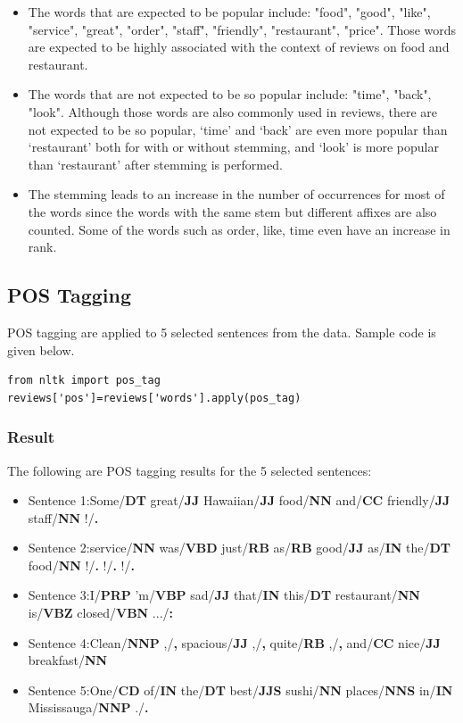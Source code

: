 \documentclass[sigconf]{acmart}
\begin{document}
\begin{itemize}
\item The words that are expected to be popular include: "food", "good", "like", "service", "great", "order", "staff", "friendly", "restaurant", "price". Those words are expected to be highly associated with the context of reviews on food and restaurant.
\item The words that are not expected to be so popular include: "time", "back", "look". Although those words are also commonly used in reviews, there are not expected to be so popular, ‘time’ and ‘back’ are even more popular than ‘restaurant’ both for with or without stemming, and ‘look’ is more popular than ‘restaurant’ after stemming is performed.
\item The stemming leads to an increase in the number of occurrences for most of the words since the words with the same stem but different affixes are also counted. Some of the words such as order, like, time even have an increase in rank.
\end{itemize}

\subsection{POS Tagging}
POS tagging are applied to 5 selected sentences from the data. Sample code is given below.
\begin{verbatim}
from nltk import pos_tag
reviews['pos']=reviews['words'].apply(pos_tag)
\end{verbatim}

\subsubsection{Result} The following are POS tagging results for the 5 selected sentences:
\begin{itemize}
\item{Sentence 1}:Some/\textbf{DT} great/\textbf{JJ} Hawaiian/\textbf{JJ} food/\textbf{NN} and/\textbf{CC} friendly/\textbf{JJ} staff/\textbf{NN} !/\textbf{.}
\item{Sentence 2}:service/\textbf{NN} was/\textbf{VBD} just/\textbf{RB}  as/\textbf{RB} good/\textbf{JJ} as/\textbf{IN} the/\textbf{DT} food/\textbf{NN} !/\textbf{.} !/\textbf{.} !/\textbf{.}
\item{Sentence 3}:I/\textbf{PRP} 'm/\textbf{VBP} sad/\textbf{JJ}  that/\textbf{IN} this/\textbf{DT} restaurant/\textbf{NN} is/\textbf{VBZ} closed/\textbf{VBN} .../\textbf{:}
\item{Sentence 4}:Clean/\textbf{NNP} ,/\textbf{,} spacious/\textbf{JJ} ,/\textbf{,} quite/\textbf{RB} ,/\textbf{,} and/\textbf{CC} nice/\textbf{JJ} breakfast/\textbf{NN}
\item{Sentence 5}:One/\textbf{CD} of/\textbf{IN} the/\textbf{DT} best/\textbf{JJS} sushi/\textbf{NN} places/\textbf{NNS} in/\textbf{IN} Mississauga/\textbf{NNP} ./\textbf{.}
\end{itemize}
\end{document}
